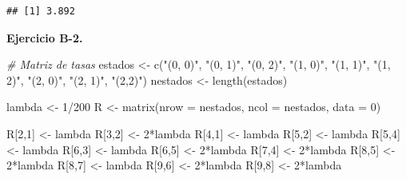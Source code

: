 \documentclass[
]{book}
\newenvironment{Shaded}{\begin{snugshade}}{\end{snugshade}}
\newcommand{\AttributeTok}[1]{\textcolor[rgb]{0.77,0.63,0.00}{#1}}
\newcommand{\CommentTok}[1]{\textcolor[rgb]{0.56,0.35,0.01}{\textit{#1}}}
\newcommand{\DecValTok}[1]{\textcolor[rgb]{0.00,0.00,0.81}{#1}}
\newcommand{\FunctionTok}[1]{\textcolor[rgb]{0.00,0.00,0.00}{#1}}
\newcommand{\NormalTok}[1]{#1}
\newcommand{\OtherTok}[1]{\textcolor[rgb]{0.56,0.35,0.01}{#1}}
\newcommand{\SpecialCharTok}[1]{\textcolor[rgb]{0.00,0.00,0.00}{#1}}
\newcommand{\StringTok}[1]{\textcolor[rgb]{0.31,0.60,0.02}{#1}}
\theoremstyle{definition}
\theoremstyle{definition}
\theoremstyle{definition}
\theoremstyle{definition}
\theoremstyle{remark}
\begin{document}
\begin{verbatim}
## [1] 3.892
\end{verbatim}

\textbf{Ejercicio B-2.}

\begin{Shaded}
\begin{Highlighting}[]
\CommentTok{\# Matriz de tasas}
\NormalTok{estados }\OtherTok{\textless{}{-}} \FunctionTok{c}\NormalTok{(}\StringTok{"(0, 0)"}\NormalTok{, }\StringTok{"(0, 1)"}\NormalTok{, }\StringTok{"(0, 2)"}\NormalTok{, }\StringTok{"(1, 0)"}\NormalTok{, }
             \StringTok{"(1, 1)"}\NormalTok{, }\StringTok{"(1, 2)"}\NormalTok{, }\StringTok{"(2, 0)"}\NormalTok{, }\StringTok{"(2, 1)"}\NormalTok{, }\StringTok{"(2,2)"}\NormalTok{)}
\NormalTok{nestados }\OtherTok{\textless{}{-}} \FunctionTok{length}\NormalTok{(estados)}

\NormalTok{lambda }\OtherTok{\textless{}{-}} \DecValTok{1}\SpecialCharTok{/}\DecValTok{200}
\NormalTok{R }\OtherTok{\textless{}{-}} \FunctionTok{matrix}\NormalTok{(}\AttributeTok{nrow =}\NormalTok{ nestados, }\AttributeTok{ncol =}\NormalTok{ nestados, }\AttributeTok{data =} \DecValTok{0}\NormalTok{)}

\NormalTok{R[}\DecValTok{2}\NormalTok{,}\DecValTok{1}\NormalTok{] }\OtherTok{\textless{}{-}}\NormalTok{ lambda }
\NormalTok{R[}\DecValTok{3}\NormalTok{,}\DecValTok{2}\NormalTok{] }\OtherTok{\textless{}{-}} \DecValTok{2}\SpecialCharTok{*}\NormalTok{lambda }
\NormalTok{R[}\DecValTok{4}\NormalTok{,}\DecValTok{1}\NormalTok{] }\OtherTok{\textless{}{-}}\NormalTok{ lambda }
\NormalTok{R[}\DecValTok{5}\NormalTok{,}\DecValTok{2}\NormalTok{] }\OtherTok{\textless{}{-}}\NormalTok{ lambda }
\NormalTok{R[}\DecValTok{5}\NormalTok{,}\DecValTok{4}\NormalTok{] }\OtherTok{\textless{}{-}}\NormalTok{ lambda }
\NormalTok{R[}\DecValTok{6}\NormalTok{,}\DecValTok{3}\NormalTok{] }\OtherTok{\textless{}{-}}\NormalTok{ lambda }
\NormalTok{R[}\DecValTok{6}\NormalTok{,}\DecValTok{5}\NormalTok{] }\OtherTok{\textless{}{-}} \DecValTok{2}\SpecialCharTok{*}\NormalTok{lambda}
\NormalTok{R[}\DecValTok{7}\NormalTok{,}\DecValTok{4}\NormalTok{] }\OtherTok{\textless{}{-}} \DecValTok{2}\SpecialCharTok{*}\NormalTok{lambda}
\NormalTok{R[}\DecValTok{8}\NormalTok{,}\DecValTok{5}\NormalTok{] }\OtherTok{\textless{}{-}} \DecValTok{2}\SpecialCharTok{*}\NormalTok{lambda}
\NormalTok{R[}\DecValTok{8}\NormalTok{,}\DecValTok{7}\NormalTok{] }\OtherTok{\textless{}{-}}\NormalTok{ lambda}
\NormalTok{R[}\DecValTok{9}\NormalTok{,}\DecValTok{6}\NormalTok{] }\OtherTok{\textless{}{-}} \DecValTok{2}\SpecialCharTok{*}\NormalTok{lambda}
\NormalTok{R[}\DecValTok{9}\NormalTok{,}\DecValTok{8}\NormalTok{] }\OtherTok{\textless{}{-}} \DecValTok{2}\SpecialCharTok{*}\NormalTok{lambda}
\end{Highlighting}
\end{Shaded}
\end{document}
